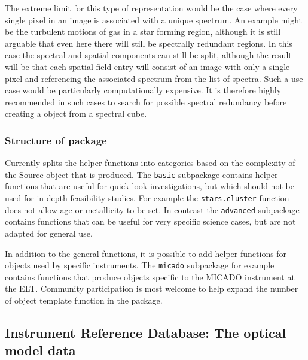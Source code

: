 The extreme limit for this type of representation would be the case where every single pixel in an image is associated with a unique spectrum.
An example might be the turbulent motions of gas in a star forming region, although it is still arguable that even here there will still be spectrally redundant regions.
In this case the spectral and spatial components can still be split, although the result will be that each spatial field entry will consist of an image with only a single pixel and referencing the associated spectrum from the list of spectra.
Such a use case would be particularly computationally expensive.
It is therefore highly recommended in such cases to search for possible spectral redundancy before creating a \Source{} object from a spectral cube.


\subsubsection{Structure of \ScopeSimtemplates{} package}
\label{structure-of-scopesim-templates-package}


Currently \ScopeSimtemplates{} splits the helper functions into categories based on the complexity of the Source object that is produced.
The \lstinline{basic} subpackage contains helper functions that are useful for quick look investigations, but which should not be used for in-depth feasibility studies.
For example the \lstinline{stars.cluster} function does not allow age or metallicity to be set.
In contrast the \lstinline{advanced} subpackage contains functions that can be useful for very specific science cases, but are not adapted for general use.

In addition to the general functions, it is possible to add helper functions for objects used by specific instruments.
The \lstinline{micado} subpackage for example contains functions that produce objects specific to the MICADO instrument at the ELT.
Community participation is most welcome to help expand the number of object template function in the \ScopeSimtemplates{} package.


\subsection{Instrument Reference Database: The optical model data}
\label{instrument-reference-database-the-optical-model-data}

